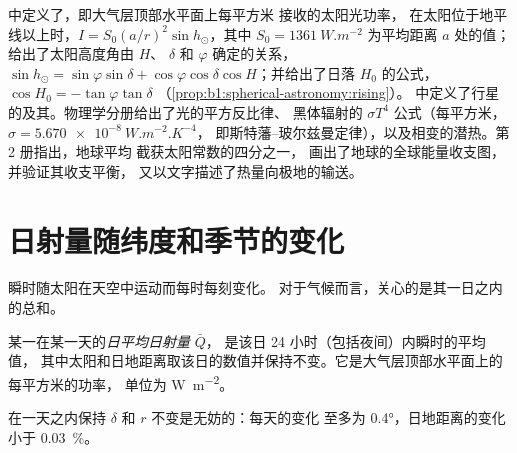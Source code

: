 \begin{recall}
中定义了，即大气层顶部水平面上每平方米
接收的太阳光功率，
在太阳位于地平线以上时，$I = S_0(a/r)^2\sin h_\odot$，其中 $S_0 = \qty{1361}{W.m^{-2}}$
为平均距离 $a$ 处的值；给出了太阳高度角由 $H$、
 $\delta$ 和 $\varphi$ 确定的关系，
$\sin h_\odot = \sin\varphi\sin\delta + \cos\varphi\cos\delta\cos H$；并给出了日落
$H_0$ 的公式，$\cos H_0 = -\tan\varphi\tan\delta$
（\cref{prop:b1:spherical-astronomy:rising}）。
中定义了行星的及其。物理学分册给出了光的平方反比律、
黑体辐射的 $\sigma T^4$ 公式（每平方米，$\sigma = \qty{5.670e-8}{W.m^{-2}.K^{-4}}$，
即斯特藩–玻尔兹曼定律），以及相变的潜热。第 2 册指出，地球平均
截获太阳常数的四分之一，
画出了地球的全球能量收支图，
并验证其收支平衡，
又以文字描述了热量向极地的输送。
\end{recall}

\section{日射量随纬度和季节的变化}\label{sec:b1:radiation-heat-transport:insolation}

瞬时随太阳在天空中运动而每时每刻变化。
对于气候而言，关心的是其一日之内的总和。

\begin{definition}[日平均日射量]\label{def:b1:radiation-heat-transport:daily-insolation}
某一在某一天的\emph{日平均日射量} $\bar Q$，
是该日 24 小时（包括夜间）内瞬时的平均值，
其中太阳和日地距离取该日的数值并保持不变。它是大气层顶部水平面上的
每平方米的功率，
单位为 \unit{W.m^{-2}}。
\end{definition}

在一天之内保持 $\delta$ 和 $r$ 不变是无妨的：每天的变化
至多为 \ang{0.4}，日地距离的变化小于 \qty{0.03}{\percent}。

